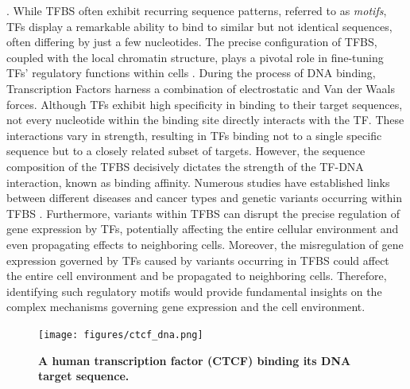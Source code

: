 \documentclass[a4paper, titlepage, openright]{book}
\begin{document}
\citep{gotea2010homotypic,lemon2000orchestrated,nolis2009transcription}.  While TFBS often exhibit recurring sequence patterns, referred to as \emph{motifs}, TFs display a remarkable ability to bind to similar but not identical sequences, often differing by just a few nucleotides. The precise configuration of TFBS, coupled with the local chromatin structure, plays a pivotal role in fine-tuning TFs' regulatory functions within cells \citep{mendenhall2013locus,maurano2015large}. During the process of DNA binding, Transcription Factors harness a combination of electrostatic and Van der Waals forces. Although TFs exhibit high specificity in binding to their target sequences, not every nucleotide within the binding site directly interacts with the TF. These interactions vary in strength, resulting in TFs binding not to a single specific sequence but to a closely related subset of targets. However, the sequence composition of the TFBS decisively dictates the strength of the TF-DNA interaction, known as binding affinity. Numerous studies have established links between different diseases and cancer types and genetic variants occurring within TFBS \citep{docquier2005heightened, katainen2015ctcf, yu2019gata1}. Furthermore, variants within TFBS can disrupt the precise regulation of gene expression by TFs, potentially affecting the entire cellular environment and even propagating effects to neighboring cells. Moreover, the misregulation of gene expression governed by TFs caused by variants occurring in TFBS could affect the entire cell environment and be propagated to neighboring cells. Therefore, identifying such regulatory motifs would provide fundamental insights on the complex mechanisms governing gene expression and the cell environment.
\begin{figure}
	\centering
	\texttt{[image: figures/ctcf\_dna.png]}
	\caption[A human transcription factor (CTCF) binding its DNA target sequence.]{\textbf{A human transcription factor (CTCF) binding its DNA target sequence.}}
	\label{fig:ctcf_dna}
\end{figure}
\end{document}
